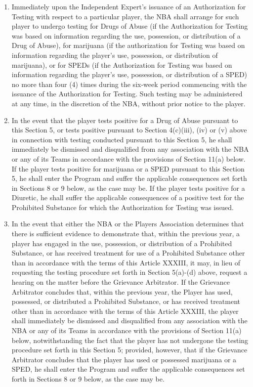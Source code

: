 \documentclass[
]{book}
\begin{document}
\begin{enumerate}
\item
  Immediately upon the Independent Expert's issuance of an Authorization for Testing with respect to a particular player, the NBA shall arrange for such player to undergo testing for Drugs of Abuse (if the Authorization for Testing was based on information regarding the use, possession, or distribution of a Drug of Abuse), for marijuana (if the authorization for Testing was based on information regarding the player's use, possession, or distribution of marijuana), or for SPEDs (if the Authorization for Testing was based on information regarding the player's use, possession, or distribution of a SPED) no more than four (4) times during the six-week period commencing with the issuance of the Authorization for Testing. Such testing may be administered at any time, in the discretion of the NBA, without prior notice to the player.
\item
  In the event that the player tests positive for a Drug of Abuse pursuant to this Section 5, or tests positive pursuant to Section 4(c)(iii), (iv) or (v) above in connection with testing conducted pursuant to this Section 5, he shall immediately be dismissed and disqualified from any association with the NBA or any of its Teams in accordance with the provisions of Section 11(a) below. If the player tests positive for marijuana or a SPED pursuant to this Section 5, he shall enter the Program and suffer the applicable consequences set forth in Sections 8 or 9 below, as the case may be. If the player tests positive for a Diuretic, he shall suffer the applicable consequences of a positive test for the Prohibited Substance for which the Authorization for Testing was issued.
\item
  In the event that either the NBA or the Players Association determines that there is sufficient evidence to demonstrate that, within the previous year, a player has engaged in the use, possession, or distribution of a Prohibited Substance, or has received treatment for use of a Prohibited Substance other than in accordance with the terms of this Article XXXIII, it may, in lieu of requesting the testing procedure set forth in Section 5(a)-(d) above, request a hearing on the matter before the Grievance Arbitrator. If the Grievance Arbitrator concludes that, within the previous year, the Player has used, possessed, or distributed a Prohibited Substance, or has received treatment other than in accordance with the terms of this Article XXXIII, the player shall immediately be dismissed and disqualified from any association with the NBA or any of its Teams in accordance with the provisions of Section 11(a) below, notwithstanding the fact that the player has not undergone the testing procedure set forth in this Section 5; provided, however, that if the Grievance Arbitrator concludes that the player has used or possessed marijuana or a SPED, he shall enter the Program and suffer the applicable consequences set forth in Sections 8 or 9 below, as the case may be.
\end{enumerate}
\end{document}
